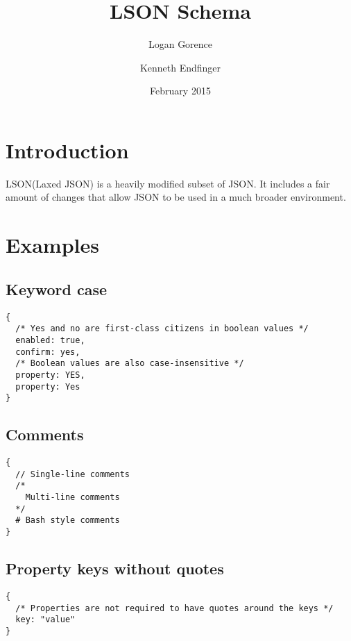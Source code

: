 \documentclass[12pt]{article}
\begin{document}
\title{LSON Schema}
\author{Logan Gorence \and Kenneth Endfinger}
\date{February 2015}
\maketitle
{}
\newpage

\tableofcontents
\newpage

\section{Introduction}
LSON(Laxed JSON) is a heavily modified subset of JSON. It includes a fair amount of changes that allow JSON to be used in a much  broader environment.
\section{Examples}
\subsection{Keyword case}
\begin{lstlisting}
{
  /* Yes and no are first-class citizens in boolean values */
  enabled: true,
  confirm: yes,
  /* Boolean values are also case-insensitive */
  property: YES,
  property: Yes
}
\end{lstlisting}
\subsection{Comments}
\begin{lstlisting}
{
  // Single-line comments
  /*
    Multi-line comments
  */
  # Bash style comments
}
\end{lstlisting}
\subsection{Property keys without quotes}
\begin{lstlisting}
{
  /* Properties are not required to have quotes around the keys */
  key: "value"
}
\end{lstlisting}
\end{document}
